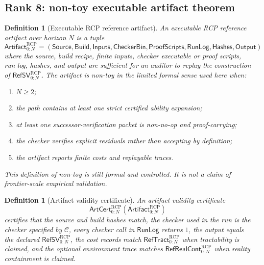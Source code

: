 \documentclass[11pt]{article}
\newtheorem{definition}[theorem]{Definition}
\newcommand{\1}{\mathbf{1}}
\newcommand{\RCP}{\mathrm{RCP}}
\begin{document}
\subsection{Rank 8: non-toy executable artifact theorem}

\begin{definition}[Executable RCP reference artifact]
\label{def:batch13r_executable_reference_artifact}
An executable RCP reference artifact over horizon \(N\) is a tuple
\[
\mathsf{Artifact}_{0:N}^{\RCP}
=(\mathsf{Source},\mathsf{Build},\mathsf{Inputs},\mathsf{CheckerBin},\mathsf{ProofScripts},\mathsf{RunLog},\mathsf{Hashes},\mathsf{Output})
\]
where the source, build recipe, finite inputs, checker executable or proof scripts, run log, hashes, and output are sufficient for an auditor to replay the construction of \(\mathsf{RefSV}_{0:N}^{\RCP}\).  The artifact is non-toy in the limited formal sense used here when:
\begin{enumerate}[label=(\roman*),leftmargin=1.5em]
    \item \(N\ge2\);
    \item the path contains at least one strict certified ability expansion;
    \item at least one successor-verification packet is non-no-op and proof-carrying;
    \item the checker verifies explicit residuals rather than accepting by definition;
    \item the artifact reports finite costs and replayable traces.
\end{enumerate}
This definition of non-toy is still formal and controlled.  It is not a claim of frontier-scale empirical validation.
\end{definition}

\begin{definition}[Artifact validity certificate]
\label{def:batch13r_artifact_validity_certificate}
An artifact validity certificate
\[
\mathsf{ArtCert}_{0:N}^{\RCP}(\mathsf{Artifact}_{0:N}^{\RCP})
\]
certifies that the source and build hashes match, the checker used in the run is the checker specified by \(\mathcal C\), every checker call in \(\mathsf{RunLog}\) returns \(1\), the output equals the declared \(\mathsf{RefSV}_{0:N}^{\RCP}\), the cost records match \(\mathsf{RefTract}_{0:N}^{\RCP}\) when tractability is claimed, and the optional environment trace matches \(\mathsf{RefRealCont}_{0:N}^{\RCP}\) when reality containment is claimed.
\end{definition}
\end{document}
